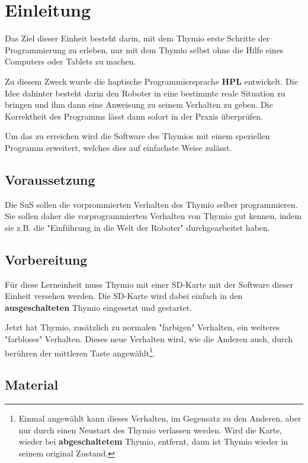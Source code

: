 \documentclass[12pt]{article}
\begin{document}


\section*{Einleitung}
Das Ziel dieser Einheit besteht darin, mit dem Thymio erste Schritte der Programmierung zu erleben, nur mit dem Thymio selbst ohne die Hilfe eines Computers oder Tablets zu machen.

Zu diesem Zweck wurde die haptische Programmiersprache {\bf HPL} entwickelt. Die Idee dahinter besteht darin den Roboter in eine bestimmte reale Situation zu bringen und ihm dann eine Anweisung zu seinem Verhalten zu geben. Die Korrektheit des Programms lässt dann sofort in der Praxis überprüfen.

Um das zu erreichen wird die Software des Thymios mit einem speziellen Programm erweitert, welches dies auf einfachste Weise zulässt. 

\subsection*{Voraussetzung}

Die SuS sollen die vorprommierten Verhalten des Thymio selber programmieren. Sie sollen daher die vorprogrammierten Verhalten von Thymio gut kennen, indem sie z.B. die "Einführung in die Welt der Roboter" durchgearbeitet haben. 

\subsection*{Vorbereitung}
Für diese Lerneinheit muss Thymio mit einer SD-Karte mit der Software dieser Einheit versehen werden. Die SD-Karte wird dabei einfach in den {\bf ausgeschalteten} Thymio eingesetzt und gestartet.

Jetzt hat Thymio, zusätzlich zu normalen "farbigen" Verhalten, ein weiteres "farbloses" Ver\-halten. Dieses neue Verhalten wird, wie die Anderen auch, durch berühren der mittleren Taste angewählt\footnote{Einmal angewählt kann dieses Verhalten, im Gegensatz zu den Anderen, aber nur durch einen Neustart des Thymio verlassen werden. Wird die Karte, wieder bei {\bf abgeschaltetem} Thymio, entfernt, dann ist Thymio wieder in seinem original Zustand.}.

\subsection*{Material}
\end{document}
